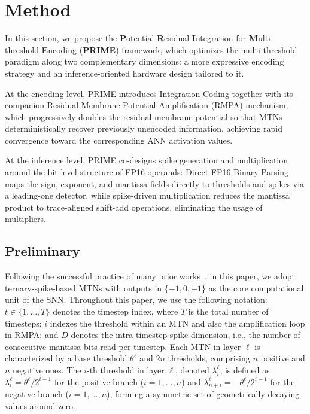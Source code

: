 \section{Method}

In this section, we propose the \textbf{P}otential-\textbf{R}esidual \textbf{I}ntegration for \textbf{M}ulti-threshold \textbf{E}ncoding (\textbf{PRIME}) framework, which optimizes the multi-threshold paradigm along two complementary dimensions: a more expressive encoding strategy and an inference-oriented hardware design tailored to it.

At the encoding level, PRIME introduces Integration Coding together with its companion Residual Membrane Potential Amplification (RMPA) mechanism, which progressively doubles the residual membrane potential so that MTNs deterministically recover previously unencoded information, achieving rapid convergence toward the corresponding ANN activation values.

At the inference level, PRIME co-designs spike generation and multiplication around the bit-level structure of FP16 operands: Direct FP16 Binary Parsing maps the sign, exponent, and mantissa fields directly to thresholds and spikes via a leading-one detector, while spike-driven multiplication reduces the mantissa product to trace-aligned shift-add operations, eliminating the usage of multipliers.

\subsection{Preliminary}
\label{sec:pre}

Following the successful practice of many prior works~\cite{you2024spikezip,wang2022signed,huang2025differential,huang2024towards}, in this paper, we adopt ternary-spike-based MTNs with outputs in $\{-1, 0, +1\}$ as the core computational unit of the SNN. Throughout this paper, we use the following notation: $t \in \{1, \ldots, T\}$ denotes the timestep index, where $T$ is the total number of timesteps; $i$ indexes the threshold within an MTN and also the amplification loop in RMPA; and $D$ denotes the intra-timestep spike dimension, i.e., the number of consecutive mantissa bits read per timestep.
Each MTN in layer $\ell$ is characterized by a base threshold $\theta^\ell$ and $2n$ thresholds, comprising $n$ positive and $n$ negative ones. The $i$-th threshold in layer $\ell$, denoted $\lambda_i^\ell$, is defined as $\lambda_i^\ell = \theta^\ell / 2^{i-1}$ for the positive branch ($i = 1, \ldots, n$) and $\lambda_{n+i}^\ell = -\theta^\ell / 2^{i-1}$ for the negative branch ($i = 1, \ldots, n$), forming a symmetric set of geometrically decaying values around zero.

